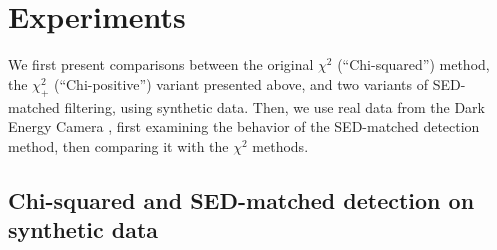 \documentclass[11pt,letterpaper,linenumbers]{aastex7}
\newcommand{\chipos}{\chi_+}
\newcommand{\changed}[1]{#1}
\begin{document}
\section{Experiments}
\label{sec:experiments}

\changed{
We first present comparisons between the original $\chi^2$ (``Chi-squared'') method, the
$\chipos^2$ (``Chi-positive'') variant presented above, and two variants of SED-matched
filtering, using synthetic data.  Then, we use real data from the Dark
Energy Camera \citep{decam}, first examining the behavior of the
SED-matched detection method, then comparing it with the $\chi^2$
methods.
}

\subsection{Chi-squared and SED-matched detection on synthetic data}
\label{sec:chisq_expt}
\end{document}
